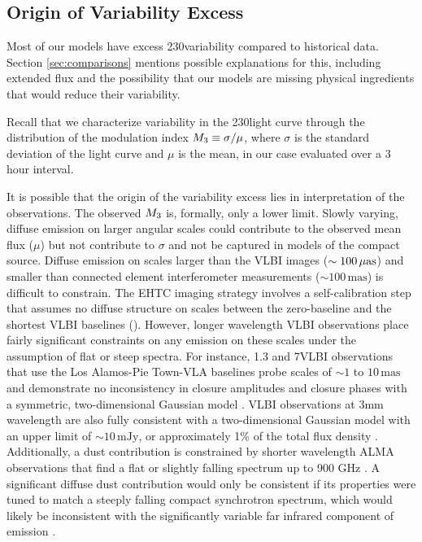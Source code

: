 

\subsection{Origin of Variability Excess}

Most of our models have excess 230\GHz variability compared to historical data.
Section \ref{sec:comparisons} mentions possible explanations for this, including extended flux and the possibility that our models are missing physical ingredients that would reduce their variability.

Recall that we characterize variability in the 230\GHz light curve through the distribution of the modulation index $M_{3} \equiv \sigma/\mu$, where $\sigma$ is the standard deviation of the light curve and $\mu$ is the mean, in our case evaluated over a 3 hour interval.

It is possible that the origin of the variability excess lies in interpretation of the observations.
The observed $M_{3}$ is, formally, only a lower limit.  Slowly varying, diffuse emission on larger angular scales could contribute to the observed mean flux ($\mu$) but not contribute to $\sigma$ and not be captured in models of the compact source.  Diffuse emission on scales larger than the VLBI images ($\sim 100\,\mathrm{\mu as}$) and smaller than connected element interferometer measurements ($\sim 100\,\mathrm{mas}$) is difficult to constrain.  The EHTC imaging strategy involves a self-calibration step that assumes no diffuse structure on scales between the zero-baseline and the shortest VLBI baselines ().  However, longer wavelength VLBI observations place fairly significant constraints on any emission on these scales under the assumption of flat or steep spectra.  For instance, 1.3 and 7\mm VLBI observations that use the Los Alamos-Pie Town-VLA baselines probe scales of $\sim 1$ to $10\,\mathrm{mas}$ and demonstrate no inconsistency in closure amplitudes and closure phases with a symmetric, two-dimensional Gaussian model \citep{2004Sci...304..704B}.  VLBI observations at 3mm wavelength are also fully consistent with a two-dimensional Gaussian model with an upper limit of $\sim 10\,\mathrm{mJy}$, or approximately 1\% of the total flux density \citep{2019A&A...621A.119B}.  Additionally, a dust contribution is constrained by shorter wavelength ALMA observations that find a flat or slightly falling spectrum up to 900 GHz \citep{2019ApJ...881L...2B}.  A significant diffuse dust contribution would only be consistent if its properties were tuned to match a steeply falling compact synchrotron spectrum, which would likely be inconsistent with the significantly variable far infrared component of \sgra emission \citep{2016ApJ...825...32S, 2018ApJ...862..129V}.

